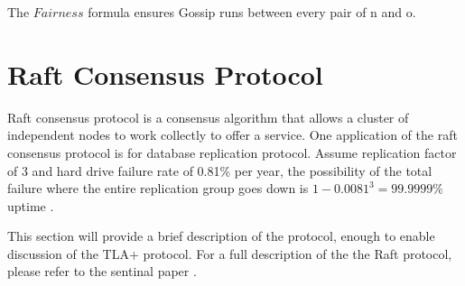 \documentclass{report}
\begin{document}
The $Fairness$ formula ensures Gossip runs between every pair of n and o. 

\chapter{Raft Consensus Protocol}

Raft consensus protocol is a consensus algorithm that allows a cluster of
independent nodes to work collectly to offer a service. One application of the
raft consensus protocol is for database replication protocol. Assume replication 
factor of 3 and hard drive failure rate of 0.81\% per year, the possibility of 
the total failure where the entire replication group goes down is $1-0.0081^3 =
99.9999\%$ uptime \cite{backblaze}.\newline

This section will provide a brief description of the protocol, enough to enable
discussion of the TLA+ protocol. For a full description of the the Raft
protocol, please refer to the sentinal paper \cite{raft}.\newline
\end{document}
